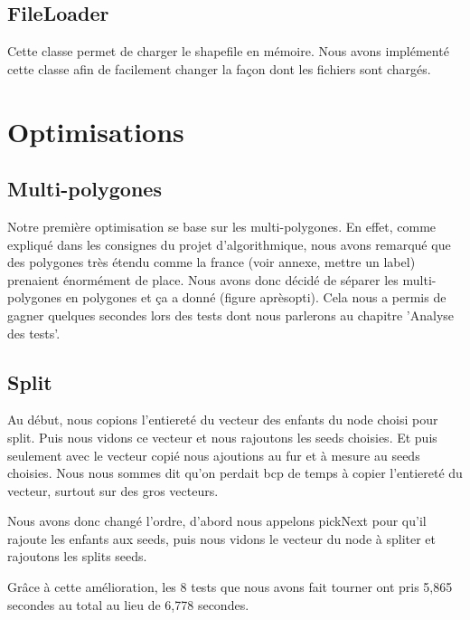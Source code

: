 \documentclass[utf8]{article}
\begin{document}
\begin{large}
  \subsection{FileLoader}
  \indent
  \par
  Cette classe permet de charger le shapefile en mémoire. Nous avons implémenté
  cette classe afin de facilement changer la façon dont les fichiers sont chargés.


  \section{Optimisations}
  \subsection{Multi-polygones}
  \indent
  \par
  Notre première optimisation se base sur les multi-polygones. En effet, comme
  expliqué dans les consignes du projet d'algorithmique, nous avons remarqué que
  des polygones très étendu comme la france (voir annexe, mettre un label)
  prenaient énormément de place. Nous avons donc décidé de séparer les
  multi-polygones en polygones et ça a donné (figure aprèsopti). Cela nous a
  permis de gagner quelques secondes lors des tests dont nous parlerons au
  chapitre 'Analyse des tests'.

  \subsection{Split}
  \indent

  \par
  Au début, nous copions l'entiereté du vecteur des enfants du node choisi pour
  split. Puis nous vidons ce vecteur et nous rajoutons les seeds choisies. Et puis
  seulement avec le vecteur copié nous ajoutions au fur et à mesure au seeds
  choisies. Nous nous sommes dit qu'on perdait bcp de temps à copier l'entiereté
  du vecteur, surtout sur des gros vecteurs.

  Nous avons donc changé l'ordre, d'abord nous appelons pickNext pour qu'il
  rajoute les enfants aux seeds, puis nous vidons le vecteur du node à spliter et
  rajoutons les splits seeds.

  Grâce à cette amélioration, les 8 tests que nous avons fait tourner ont pris
  5,865 secondes au total au lieu de 6,778 secondes.
  \par

\end{large}
\end{document}
